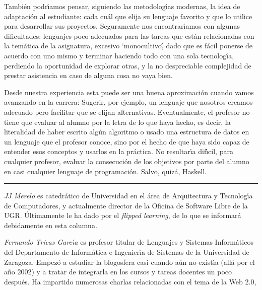 \documentclass[twoside,10pt]{article}
\newcounter{num}
\begin{document}
\begin{multicols}{2}
Tambi\'en podr\'{\i}amos pensar, siguiendo las metodolog\'{\i}as modernas, la idea de
adaptaci\'on al estudiante: cada cu\'al que elija su lenguaje favorito y que lo
utilice
para desarrollar sus proyectos. Seguramente nos encontrar\'{\i}amos con algunas
dificultades: lenguajes poco adecuados para las tareas que est\'an
relacionadas con la tem\'atica de la asignatura, excesivo `monocultivo\',
dado que es f\'acil ponerse de acuerdo con uno mismo y terminar haciendo todo
con una sola tecnolog\'{\i}a, perdiendo la oportunidad de explorar otras, y la
no despreciable complejidad de prestar asistencia en caso de alguna cosa no
vaya bien. 

Desde nuestra experiencia esta puede ser una buena aproximaci\'on cuando
vamos avanzando en la carrera: Sugerir, por ejemplo, un lenguaje que
nosotros creamos adecuado pero facilitar que se elijan alternativas.
Eventualmente, el profesor no tiene que evaluar al
alumno por la letra de lo que haya hecho, es decir, la literalidad de
haber escrito alg\'un algoritmo o usado una estructura de datos en un
lenguaje que el profesor conoce, sino por el hecho de que haya sido
capaz de entender esos conceptos y usarlos en la pr\'actica. No
resultar\'{\i}a dif\'{\i}cil, para cualquier profesor, evaluar la consecuci\'on de
los objetivos por parte del alumno en casi cualquier lenguaje de
programaci\'on. Salvo, quiz\'a, Haskell.
\noindent\rule{86mm}{1pt}
\vspace{1ex} {\small{\begin{window} 
\noindent\emph{JJ Merelo} es catedr\'{a}tico de Universidad
en el \'area de Arquitectura y Tecnolog\'{\i}a de Computadores, y
actualmente director de la Oficina de Software Libre de la UGR.
\'{U}ltimamente le ha dado por el \textsl{flipped
learning}, de lo que se informar\'{a} debidamente en esta columna.
\end{window}}} 
\medskip

{\small{\begin{window}
		\noindent \emph{Fernando Tricas Garc\'{\i}a} es profesor
		titular de Lenguajes y Sistemas Inform\'{a}ticos del Departamento
		de Inform\'{a}tica e Ingenier\'{\i}a de Sistemas de la Universidad de
		Zaragoza.  Empez\'{o} a estudiar la blogosfera casi cuando a\'{u}n no
		exist\'{\i}a (all\'{a} por el a\~{n}o 2002) y a tratar de integrarla en los
		cursos y tareas docentes un poco despu\'{e}s.  Ha impartido
		numerosas charlas relacionadas con el tema de la Web 2.0, 


\end{window}}}
\end{multicols}
\end{document}

